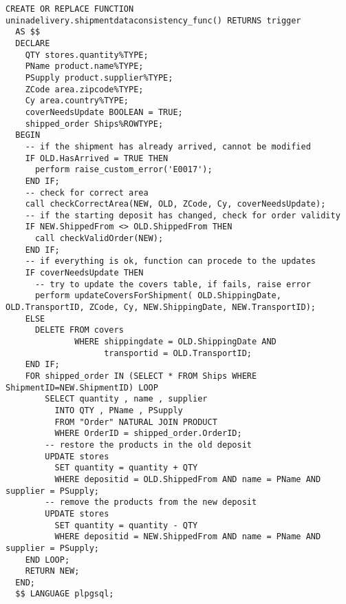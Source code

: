 \begin{lstlisting}[caption={Funzione completa}]
  CREATE OR REPLACE FUNCTION uninadelivery.shipmentdataconsistency_func() RETURNS trigger
  AS $$
  DECLARE
    QTY stores.quantity%TYPE;
    PName product.name%TYPE;
    PSupply product.supplier%TYPE;
    ZCode area.zipcode%TYPE;
    Cy area.country%TYPE;
    coverNeedsUpdate BOOLEAN = TRUE;
    shipped_order Ships%ROWTYPE;
  BEGIN
    -- if the shipment has already arrived, cannot be modified
    IF OLD.HasArrived = TRUE THEN
      perform raise_custom_error('E0017');
    END IF;
    -- check for correct area
    call checkCorrectArea(NEW, OLD, ZCode, Cy, coverNeedsUpdate);
    -- if the starting deposit has changed, check for order validity
    IF NEW.ShippedFrom <> OLD.ShippedFrom THEN
      call checkValidOrder(NEW);
    END IF;
    -- if everything is ok, function can procede to the updates
    IF coverNeedsUpdate THEN
      -- try to update the covers table, if fails, raise error
      perform updateCoversForShipment( OLD.ShippingDate, OLD.TransportID, ZCode, Cy, NEW.ShippingDate, NEW.TransportID);
    ELSE 
      DELETE FROM covers 
              WHERE shippingdate = OLD.ShippingDate AND 
                    transportid = OLD.TransportID;
    END IF;
    FOR shipped_order IN (SELECT * FROM Ships WHERE ShipmentID=NEW.ShipmentID) LOOP
        SELECT quantity , name , supplier 
          INTO QTY , PName , PSupply
          FROM "Order" NATURAL JOIN PRODUCT
          WHERE OrderID = shipped_order.OrderID;
        -- restore the products in the old deposit
        UPDATE stores
          SET quantity = quantity + QTY
          WHERE depositid = OLD.ShippedFrom AND name = PName AND supplier = PSupply;
        -- remove the products from the new deposit
        UPDATE stores
          SET quantity = quantity - QTY
          WHERE depositid = NEW.ShippedFrom AND name = PName AND supplier = PSupply;
    END LOOP;
    RETURN NEW;
  END;
  $$ LANGUAGE plpgsql;
\end{lstlisting}

